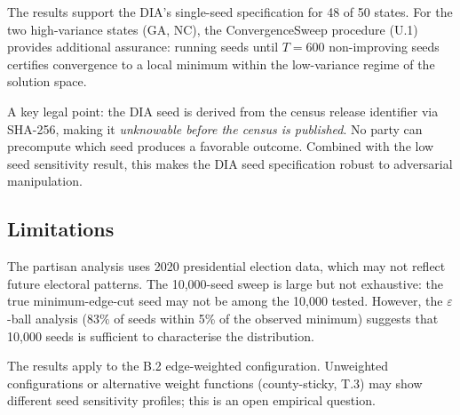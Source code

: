 The results support the DIA's single-seed specification for 48 of 50 states.
For the two high-variance states (GA, NC), the ConvergenceSweep procedure
(U.1) provides additional assurance: running seeds until $T = 600$
non-improving seeds certifies convergence to a local minimum within
the low-variance regime of the solution space.

A key legal point: the DIA seed is derived from the census release
identifier via SHA-256, making it \emph{unknowable before the census
is published}.  No party can precompute which seed produces a favorable
outcome.  Combined with the low seed sensitivity result, this makes the
DIA seed specification robust to adversarial manipulation.

\subsection{Limitations}

The partisan analysis uses 2020 presidential election data, which may
not reflect future electoral patterns.  The 10,000-seed sweep is large
but not exhaustive: the true minimum-edge-cut seed may not be among
the 10,000 tested.  However, the $\varepsilon$-ball analysis
($83\%$ of seeds within 5\% of the observed minimum) suggests that
10,000 seeds is sufficient to characterise the distribution.

The results apply to the B.2 edge-weighted configuration.  Unweighted
configurations or alternative weight functions (county-sticky, T.3) may
show different seed sensitivity profiles; this is an open empirical question.
